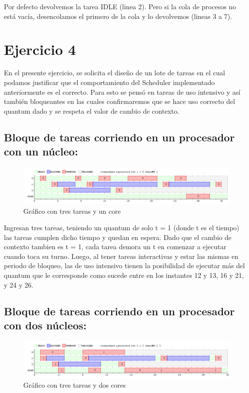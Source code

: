 \documentclass[a4paper,11pt]{article}
\begin{document}
			
			
			Por defecto devolvemos la tarea IDLE (linea 2). Pero si la cola de procesos no está vacía, desencolamos el primero de la cola y lo devolvemos (lineas 3 a 7).

\section{Ejercicio 4}
En el presente ejercicio, se solicita el diseño de un lote de tareas en el cual podamos justificar que el comportamiento del Scheduler implementado anteriormente es el correcto. Para esto se pens\'o en tareas de uso intensivo y as\'i tambi\'en bloqueantes en las cuales confirmaremos que se hace uso correcto del quantum dado y se respeta el valor de cambio de contexto.

\subsection{Bloque de tareas corriendo en un procesador con un n\'ucleo:}

\begin{figure}[H]
\centering
\includegraphics[scale=.6, width=1\textwidth]{graficos/ej4-1core-q}
\caption{Gráfico con tres tareas y un core}
\end{figure}

Ingresan tres tareas, teniendo un quantum de solo t = 1 (donde t es el tiempo) las tareas cumplen dicho tiempo y quedan en espera. Dado que el cambio de contexto tambien es t = 1, cada tarea demora un t en comenzar a ejecutar cuando toca su turno. Luego, al tener tareas interactivas y estar las mismas en periodo de bloqueo, las de uso intensivo tienen la posibilidad de ejecutar m\'as del quantum que le corresponde como sucede entre en los instantes 12 y 13, 16 y 21, y 24 y 26.

\subsection{Bloque de tareas corriendo en un procesador con dos n\'ucleos:}

\begin{figure}[H]
\centering
\includegraphics[scale=.6, width=1\textwidth]{graficos/ej4-2cores-q+m}
\caption{Gráfico con tres tareas y dos cores}
\end{figure}
\end{document}
